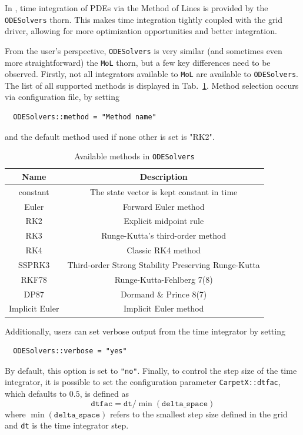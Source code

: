 In \CarpetX, time integration of PDEs via the Method of Lines is provided by the \texttt{ODESolvers} thorn. This makes time integration tightly coupled with the grid driver, allowing for more optimization opportunities and better integration.

From the user's perspective, \texttt{ODESolvers} is very similar (and sometimes even more straightforward) the \texttt{MoL} thorn, but a few key differences need to be observed. Firstly, not all integrators available to \texttt{MoL} are available to \texttt{ODESolvers}. The list of all supported methods is displayed in Tab.~\ref{tab:odesolvers_methods}. Method selection occurs via configuration file, by setting
%
\begin{verbatim}
  ODESolvers::method = "Method name"
\end{verbatim}
%
and the default method used if none other is set is "RK2".

\begin{table}[hb]
  \centering
  \begin{tabular}{cc}
  Name           & Description                                         \\ \hline\hline
  constant       & The state vector is kept constant in time           \\
  Euler          & Forward Euler method                                \\
  RK2            & Explicit midpoint rule                              \\
  RK3            & Runge-Kutta's third-order method                    \\
  RK4            & Classic RK4 method                                  \\
  SSPRK3         & Third-order Strong Stability Preserving Runge-Kutta \\
  RKF78          & Runge-Kutta-Fehlberg 7(8)                           \\
  DP87           & Dormand \& Prince 8(7)                              \\
  Implicit Euler & Implicit Euler method                               \\ \hline\hline
  \end{tabular}
  \caption{Available methods in \texttt{ODESolvers}}
  \label{tab:odesolvers_methods}
\end{table}

Additionally, users can set verbose output from the time integrator by setting
%
\begin{verbatim}
  ODESolvers::verbose = "yes"
\end{verbatim}
%
By default, this option is set to \texttt{"no"}. Finally, to control the step size of the time integrator, it is possible to set the configuration parameter \texttt{CarpetX::dtfac}, which defaults to $0.5$, is defined as
%
\begin{equation}
  \texttt{dtfac} = \texttt{dt}/\min(\texttt{delta\_space})
\end{equation}
%
where $\min(\texttt{delta\_space})$ refers to the smallest step size defined in the \CarpetX\space grid and \texttt{dt} is the time integrator step.

